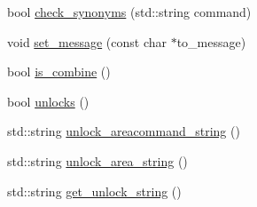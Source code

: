 \begin{DoxyCompactItemize}
bool \hyperlink{class_item_command_a7e2827365e9a8521fded9334cb53fb7f}{check\-\_\-synonyms} (std\-::string command)
\item 
void \hyperlink{class_item_command_abe177c8696e00480a716959b335ebca8}{set\-\_\-message} (const char $\ast$to\-\_\-message)
\item 
bool \hyperlink{class_item_command_a71023af77dc1cae418995588e1fead9d}{is\-\_\-combine} ()
\item 
bool \hyperlink{class_item_command_a74c82a6f88120d2ccaa6fbba4353fe17}{unlocks} ()
\item 
std\-::string \hyperlink{class_item_command_a9d663365564ebb4c7ed39ce73d995631}{unlock\-\_\-areacommand\-\_\-string} ()
\item 
std\-::string \hyperlink{class_item_command_a08a215a5fab2593301ca90ed794267d7}{unlock\-\_\-area\-\_\-string} ()
\item 
std\-::string \hyperlink{class_item_command_ab13f510d664339b267fc721622ab671a}{get\-\_\-unlock\-\_\-string} ()
\end{DoxyCompactItemize}
